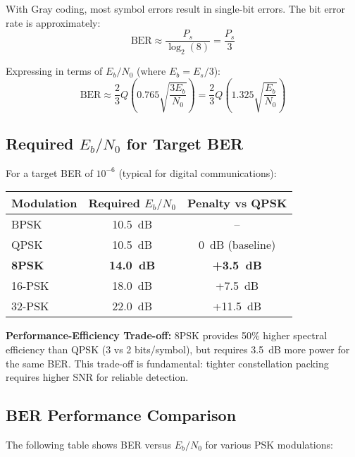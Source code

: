 With Gray coding, most symbol errors result in single-bit errors. The bit error rate is approximately:
\begin{equation}
\mathrm{BER} \approx \frac{P_s}{\log_2(8)} = \frac{P_s}{3}
\end{equation}

Expressing in terms of $E_b/N_0$ (where $E_b = E_s/3$):
\begin{equation}
\mathrm{BER} \approx \frac{2}{3}Q\left(0.765\sqrt{\frac{3E_b}{N_0}}\right) = \frac{2}{3}Q\left(1.325\sqrt{\frac{E_b}{N_0}}\right)
\end{equation}

\subsection{Required $E_b/N_0$ for Target BER}

For a target BER of $10^{-6}$ (typical for digital communications):

\begin{center}
\begin{tabular}{@{}lcc@{}}
\toprule
Modulation & Required $E_b/N_0$ & Penalty vs QPSK \\
\midrule
BPSK & 10.5~dB & -- \\
QPSK & 10.5~dB & 0~dB (baseline) \\
\textbf{8PSK} & \textbf{14.0~dB} & \textbf{+3.5~dB} \\
16-PSK & 18.0~dB & +7.5~dB \\
32-PSK & 22.0~dB & +11.5~dB \\
\bottomrule
\end{tabular}
\end{center}

\begin{keyconcept}
\textbf{Performance-Efficiency Trade-off:} 8PSK provides 50\% higher spectral efficiency than QPSK (3 vs 2 bits/symbol), but requires 3.5~dB more power for the same BER. This trade-off is fundamental: tighter constellation packing requires higher SNR for reliable detection.
\end{keyconcept}

\subsection{BER Performance Comparison}

The following table shows BER versus $E_b/N_0$ for various PSK modulations:

